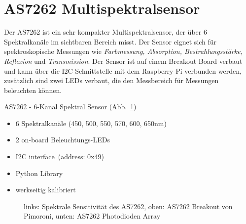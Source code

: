 \documentclass[
  11pt,
  a4paperpaper,
  oneside, openany  ,captions=tableheading
]{scrbook}
\providecommand{\tightlist}{%
  \setlength{\itemsep}{0pt}\setlength{\parskip}{0pt}}
\theoremstyle{definition}
\theoremstyle{remark}
\begin{document}
\section{\texorpdfstring{AS7262
Multispektralsensor}{AS7262 Multispektralsensor}}\label{as7262-multispektralsensor}

Der AS7262 ist ein sehr kompakter Multispektralsensor, der über 6
Spektralkanäle im sichtbaren Bereich misst. Der Sensor eignet sich für
spektroskopische Messungen wie \emph{Farbmessung, Absorption,
Bestrahlungsstärke, Reflexion} und \emph{Transmission}. Der Sensor ist
auf einem Breakout Board verbaut und kann über die I2C Schnittstelle mit
dem Raspberry Pi verbunden werden, zusätzlich sind zwei LEDs verbaut,
die den Messbereich für Messungen beleuchten können.

AS7262 - 6-Kanal Spektral Sensor (Abb.~\ref{fig-as7262})

\begin{itemize}
\tightlist
\item
  6 Spektralkanäle (450, 500, 550, 570, 600, 650nm)
\item
  2 on-board Beleuchtungs-LEDs
\item
  I2C interface~(address: 0x49)
\item
  Python Library
\item
  werkseitig kalibriert
\end{itemize}

\begin{figure}


\caption{\label{fig-as7262}links: Spektrale Sensitivität des AS7262,
oben: AS7262 Breakout von Pimoroni, unten: AS7262 Photodioden Array}

\end{figure}%
\end{document}
